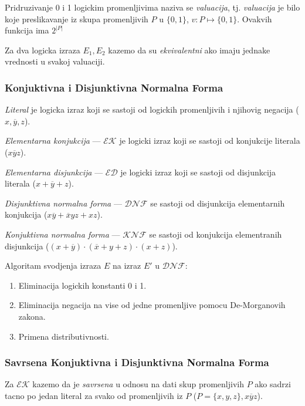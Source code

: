 \documentclass[12p,a4paper]{article}
\begin{document}
\begin{multicols}{2}
    Pridruzivanje 0 i 1 logickim promenljivima naziva se \emph{valuacija}, tj.
    \emph{valuacija} je bilo koje preslikavanje iz skupa promenljivih $P$ u 
    $\{0, 1\}$, $v: P \mapsto \{0, 1\}$. Ovakvih funkcija ima $2^{|P|}$

    Za dva logicka izraza $E_1, E_2$ kazemo da su \emph{ekvivalentni} ako imaju
    jednake vrednosti u svakoj valuaciji.

    \subsubsection{Konjuktivna i Disjunktivna Normalna Forma}

    \emph{Literal} je logicka izraz koji se sastoji od logickih promenljivih i 
    njihovig negacija ($x, \overline{y}, z$).
    
    \emph{Elementarna konjukcija} --- $\mathcal{EK}$ je logicki izraz koji se 
    sastoji od konjukcije literala ($x \overline{y} z$).

    \emph{Elementarna disjunkcija} --- $\mathcal{ED}$ je logicki izraz koji se
    sastoji od disjunkcija literala ($ x + \overline{y} + z$).

    \emph{Disjunktivna normalna forma} --- $\mathcal{DNF}$ se sastoji od 
    disjunkcija elementarnih konjukcija 
    ($x \overline{y} + \overline{x} y z + x z$).

    \emph{Konjuktivna normalna forma} --- $\mathcal{KNF}$ se sastoji od 
    konjukcija elementranih disjunkcija
    ($(x + \overline{y} ) \cdot (\overline{x} + y + z) \cdot (x + z)$).

    Algoritam svodjenja izraza $E$ na izraz $E'$ u $\mathcal{DNF}$:
    \begin{enumerate}
        \itemsep0em
        \item Eliminacija logickih konstanti 0 i 1.
        \item Eliminacija negacija na vise od jedne promenljive pomocu 
              De-Morganovih zakona.
        \item Primena distributivnosti.
    \end{enumerate}

    \subsubsection{Savrsena Konjuktivna i Disjunktivna Normalna Forma}

    Za $\mathcal{EK}$ kazemo da je \emph{savrsena} u odnosu na dati skup
    promenljivih $P$ ako sadrzi tacno po jedan literal za svako od 
    promenljivih iz $P$ ($P = \{x, y, z\}, x \overline{y} z$).


\end{multicols}
\end{document}
